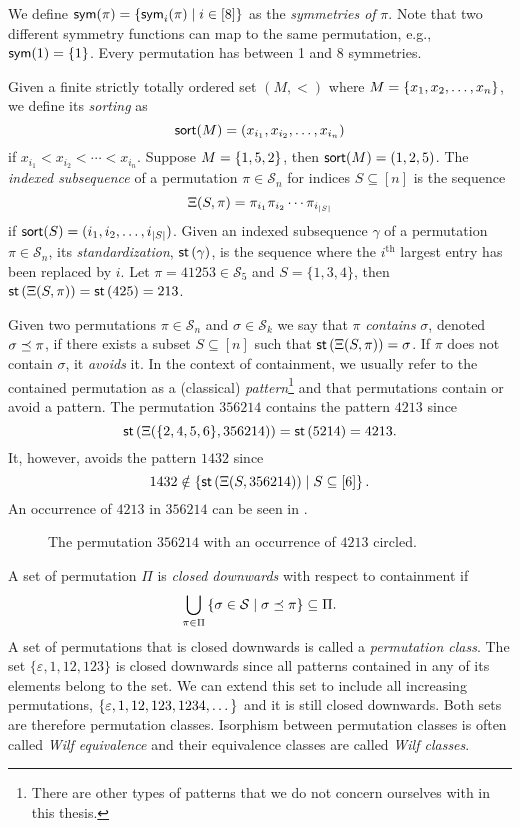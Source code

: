 We define $\textsf{sym}(\pi) = \left\{\textsf{sym}_i(\pi) \mid i \in [8]\right\}$ as the \emph{symmetries of} $\pi$. Note that two different symmetry functions can map to the same permutation, e.g., $\textsf{sym}(1) = \left\{1\right\}$. Every permutation has between 1 and 8 symmetries.

Given a finite strictly totally ordered set $(M, <)$ where $M = \left\{x_1,x_2,\dotsc,x_n\right\}$, we define its \emph{sorting} as
\[
    \textsf{sort}(M) = (x_{i_1},x_{i_2},\dotsc,x_{i_n})
\]
if $x_{i_1} < x_{i_2} < \dotsm < x_{i_n}$. Suppose $M=\left\{1,5,2\right\}$, then $\textsf{sort}(M) = (1,2,5)$. The \emph{indexed subsequence} of a permutation $\pi \in \mathcal{S}_n$ for indices $S\subseteq [n]$ is the sequence
\[
    \Xi(S,\pi)=\pi_{i_1} \pi_{i_2} \dotsm \pi_{i_{|S|}}
\]
if $\textsf{sort}(S) = (i_1,i_2,\dotsc,i_{|S|})$. Given an indexed subsequence $\gamma$ of a permutation $\pi \in \mathcal{S}_n$, its \emph{standardization}, $\textsf{st}\left(\gamma\right)$, is the sequence where the $i^\text{th}$ largest entry has been replaced by $i$. Let $\pi = 41253 \in \mathcal{S}_5$ and $S=\{1,3,4\}$, then $\textsf{st}\left(\Xi(S,\pi)\right) = \textsf{st}\left(425\right) = 213$.

Given two permutations $\pi \in \mathcal{S}_n$ and $\sigma \in \mathcal{S}_k$ we say that $\pi$ \emph{contains} $\sigma$, denoted $\sigma \preceq \pi$, if there exists a subset $S \subseteq [n]$ such that $\textsf{st}\left(\Xi(S,\pi)\right) = \sigma$. If $\pi$ does not contain $\sigma$, it \emph{avoids} it. In the context of containment, we usually refer to the contained permutation as a (classical) \emph{pattern}\footnote{There are other types of patterns that we do not concern ourselves with in this thesis.} and that permutations contain or avoid a pattern. The permutation $356214$ contains the pattern $4213$ since
\[
    \textsf{st}\left(\Xi(\{2, 4, 5, 6\},356214)\right) = \textsf{st}\left(5214\right) = 4213.
\]
It, however, avoids the pattern $1432$ since
\[
    1432 \notin \left\{\textsf{st}\left(\Xi(S,356214)\right) \mid S \subseteq [6]\right\}.
\]
An occurrence of $4213$ in $356214$ can be seen in .

\begin{figure}[ht!]
    \centering
    
    \caption{The permutation $356214$ with an occurrence of $4213$ circled.}
    \label{fig:pattern_containment}
\end{figure}

A set of permutation $\Pi$ is \emph{closed downwards} with respect to containment if 
\[
    \bigcup_{\pi \in \Pi}\left\{\sigma \in \mathcal{S} \mid \sigma \preceq \pi\right\} \subseteq \Pi.
\]
A set of permutations that is closed downwards is called a \emph{permutation class}. The set $\{\varepsilon, 1, 12, 123\}$ is closed downwards since all patterns contained in any of its elements belong to the set. We can extend this set to include all increasing permutations, $\left\{\varepsilon, 1, 12, 123, 1234, \dotsc\right\}$ and it is still closed downwards. Both sets are therefore permutation classes. Isorphism between permutation classes is often called \emph{Wilf equivalence} and their equivalence classes are called \emph{Wilf classes}. 

